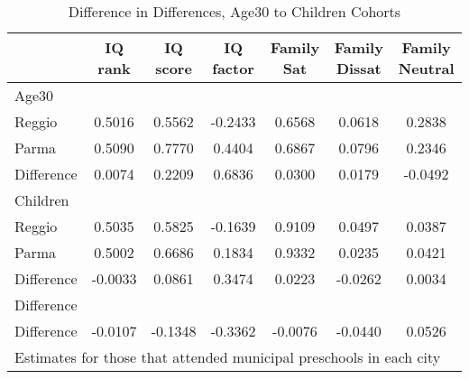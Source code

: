 \begin{table}[htbp]\centering
\caption{Difference in Differences, Age30 to Children Cohorts}
\begin{tabular}{l*{6}{c}}
\hline\hline
            &     IQ rank&    IQ score&   IQ factor&  Family Sat&Family Dissat&Family Neutral\\
\hline
Age30       &            &            &            &            &            &            \\
Reggio      &      0.5016&      0.5562&     -0.2433&      0.6568&      0.0618&      0.2838\\
Parma       &      0.5090&      0.7770&      0.4404&      0.6867&      0.0796&      0.2346\\
Difference  &      0.0074&      0.2209&      0.6836&      0.0300&      0.0179&     -0.0492\\
\hline
Children    &            &            &            &            &            &            \\
Reggio      &      0.5035&      0.5825&     -0.1639&      0.9109&      0.0497&      0.0387\\
Parma       &      0.5002&      0.6686&      0.1834&      0.9332&      0.0235&      0.0421\\
Difference  &     -0.0033&      0.0861&      0.3474&      0.0223&     -0.0262&      0.0034\\
\hline
Difference  &            &            &            &            &            &            \\
Difference  &     -0.0107&     -0.1348&     -0.3362&     -0.0076&     -0.0440&      0.0526\\
\hline\hline
\multicolumn{7}{l}{\footnotesize Estimates for those that attended municipal preschools in each city}\\
\end{tabular}
\end{table}
